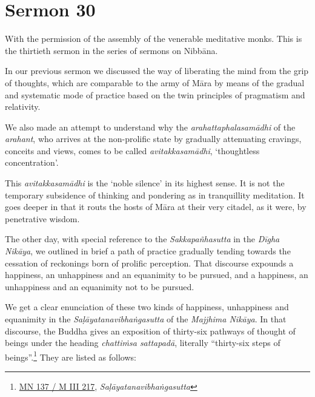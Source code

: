 \chapter{Sermon 30}

\NibbanaOpeningQuote

With the permission of the assembly of the venerable meditative monks. This is the thirtieth sermon in the series of sermons on Nibbāna.

In our previous sermon we discussed the way of liberating the mind from the grip of thoughts, which are comparable to the army of Māra by means of the gradual and systematic mode of practice based on the twin principles of pragmatism and relativity.

We also made an attempt to understand why the \emph{arahattaphalasamādhi} of the \emph{arahant}, who arrives at the non-prolific state by gradually attenuating cravings, conceits and views, comes to be called \emph{avitakkasamādhi}, `thoughtless concentration'.

This \emph{avitakkasamādhi} is the `noble silence' in its highest sense. It is not the temporary subsidence of thinking and pondering as in tranquillity meditation. It goes deeper in that it routs the hosts of Māra at their very citadel, as it were, by penetrative wisdom.

The other day, with special reference to the \emph{Sakkapañhasutta} in the \emph{Dīgha Nikāya}, we outlined in brief a path of practice gradually tending towards the cessation of reckonings born of prolific perception. That discourse expounds a happiness, an unhappiness and an equanimity to be pursued, and a happiness, an unhappiness and an equanimity not to be pursued.

We get a clear enunciation of these two kinds of happiness, unhappiness and equanimity in the \emph{Saḷāyatanavibhaṅgasutta} of the \emph{Majjhima Nikāya}. In that discourse, the Buddha gives an exposition of thirty-six pathways of thought of beings under the heading \emph{chattiṁsa sattapadā}, literally ``thirty-six steps of beings''.\footnote{\href{https://suttacentral.net/mn137/pli/ms}{MN 137 / M III 217}, \emph{Saḷāyatanavibhaṅgasutta}} They are listed as follows:

